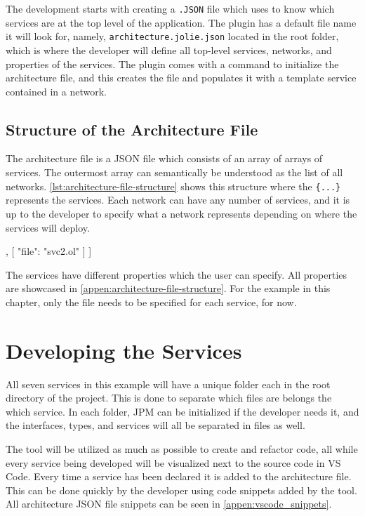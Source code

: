 The development starts with creating a \texttt{.JSON} file which \toolname[] uses to know which services are at the top level of the application.
The plugin has a default file name it will look for, namely, \texttt{architecture.jolie.json} located in the root folder, which is where the developer will define all top-level services, networks, and properties of the services.
The plugin comes with a command to initialize the architecture file, and this creates the file and populates it with a template service contained in a network.

\subsection{Structure of the Architecture File}
The architecture file is a JSON file which consists of an array of arrays of services. The outermost array can semantically be understood as the list of all networks.
\cref{lst:architecture-file-structure} shows this structure where the \texttt{\{...\}} represents the services. Each network can have any number of services, and it is up to the
developer to specify what a network represents depending on where the services will deploy.

\begin{jsonlisting}[][caption={Structure of the architecture JSON file showing two networks.}, label=lst:architecture-file-structure]
[
    [
        { "file": "svc1.ol" }
    ],
    [
        { "file": "svc2.ol" }
    ]
]
\end{jsonlisting}

The services have different properties which the user can specify. All properties are showcased in \cref{appen:architecture-file-structure}.
For the example in this chapter, only the file needs to be specified for each service, for now.

\section{Developing the Services}
All seven services in this example will have a unique folder each in the root directory of the project. This is done to separate which files are belongs the which service.
In each folder, JPM can be initialized if the developer needs it, and the interfaces, types, and services will all be separated in files as well.

The tool will be utilized as much as possible to create and refactor code, all while every service being developed will be visualized next to the source code in VS Code.
Every time a service has been declared it is added to the architecture file. This can be done quickly by the developer using code snippets added by the tool. All architecture JSON file snippets can be seen in \cref{appen:vscode_snippets}.
